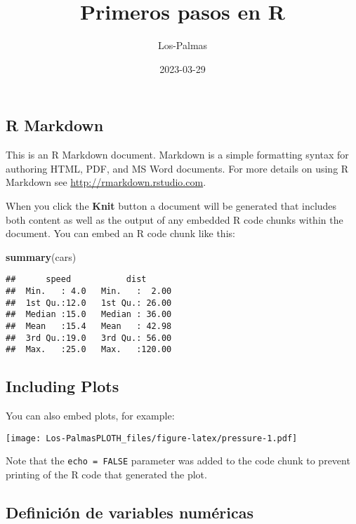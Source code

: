 \documentclass[
]{article}
\title{Primeros pasos en R}
\author{Los-Palmas}
\date{2023-03-29}
\newenvironment{Shaded}{\begin{snugshade}}{\end{snugshade}}
\newcommand{\FunctionTok}[1]{\textcolor[rgb]{0.13,0.29,0.53}{\textbf{#1}}}
\newcommand{\NormalTok}[1]{#1}
\begin{document}
\maketitle

\hypertarget{r-markdown}{%
\subsection{R Markdown}\label{r-markdown}}

This is an R Markdown document. Markdown is a simple formatting syntax
for authoring HTML, PDF, and MS Word documents. For more details on
using R Markdown see \url{http://rmarkdown.rstudio.com}.

When you click the \textbf{Knit} button a document will be generated
that includes both content as well as the output of any embedded R code
chunks within the document. You can embed an R code chunk like this:

\begin{Shaded}
\begin{Highlighting}[]
\FunctionTok{summary}\NormalTok{(cars)}
\end{Highlighting}
\end{Shaded}

\begin{verbatim}
##      speed           dist       
##  Min.   : 4.0   Min.   :  2.00  
##  1st Qu.:12.0   1st Qu.: 26.00  
##  Median :15.0   Median : 36.00  
##  Mean   :15.4   Mean   : 42.98  
##  3rd Qu.:19.0   3rd Qu.: 56.00  
##  Max.   :25.0   Max.   :120.00
\end{verbatim}

\hypertarget{including-plots}{%
\subsection{Including Plots}\label{including-plots}}

You can also embed plots, for example:

\texttt{[image: Los-PalmasPLOTH\_files/figure-latex/pressure-1.pdf]}

Note that the \texttt{echo\ =\ FALSE} parameter was added to the code
chunk to prevent printing of the R code that generated the plot.

\hypertarget{definiciuxf3n-de-variables-numuxe9ricas}{%
\subsection{Definición de variables
numéricas}\label{definiciuxf3n-de-variables-numuxe9ricas}}
\end{document}
